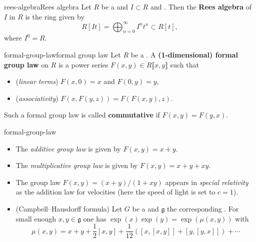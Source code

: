 \begin{topic}{rees-algebra}{Rees algebra}
    Let $R$ be a  and $I \subset R$ and . Then the \textbf{Rees algebra} of $I$ in $R$ is the ring given by
    \[ R[It] = \bigoplus_{n = 0}^\infty I^n t^n \subset R[t] , \]
    where $I^0 = R$. %
\end{topic}

\begin{topic}{formal-group-law}{formal group law}
    Let $R$ be a . A \textbf{(1-dimensional) formal group law} on $R$ is a power series $F(x, y) \in R\llbracket x, y \rrbracket$ such that
    \begin{itemize}
        \item (\textit{linear terms}) $F(x, 0) = x$ and $F(0, y) = y$,
        \item (\textit{associativity}) $F(x, F(y, z)) = F(F(x, y), z)$.
    \end{itemize}
    Such a formal group law is called \textbf{commutative} if $F(x, y) = F(y, x)$.
\end{topic}

\begin{example}{formal-group-law}
    \begin{itemize}
        \item The \textit{additive group law} is given by $F(x, y) = x + y$.
        \item The \textit{multiplicative group law} is given by $F(x, y) = x + y + xy$.
        \item The group law $F(x, y) = (x + y) / (1 + xy)$ appears in \textit{special relativity} as the addition law for velocities (here the speed of light is set to $c = 1$).
        \item (Campbell--Hausdorff formula) Let $G$ be a  and $\mathfrak{g}$ the corresponding . For small enough $x, y \in \mathfrak{g}$ one has $\exp(x) \exp(y) = \exp(\mu(x, y))$ with
        \[ \mu(x, y) = x + y + \frac{1}{2} [x, y] + \frac{1}{12}([x, [x, y]] + [y, [y, x]]) + \cdots \]
    \end{itemize}
\end{example}

